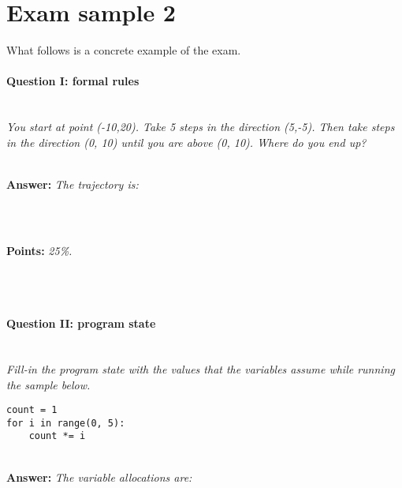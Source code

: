 \section*{Exam sample 2}
What follows is a concrete example of the exam.


\paragraph{Question I: formal rules} \ \\

\textit{You start at point (-10,20). Take 5 steps in the direction (5,-5). Then take steps in the direction (0, 10) until you are above (0, 10). Where do you end up?}

\ \\ 

\textbf{Answer:} \textit{The trajectory is:}

\begin{lstlisting}


\end{lstlisting}

\ \\ 

\textbf{Points:} \textit{25\%.}

\ \\ 
\ \\ 

\paragraph{Question II: program state} \ \\ 

\textit{Fill-in the program state with the values that the variables assume while running the sample below.}

\begin{lstlisting}
count = 1
for i in range(0, 5):
    count *= i
\end{lstlisting}

\ \\ 

\textbf{Answer:} \textit{The variable allocations are:}



